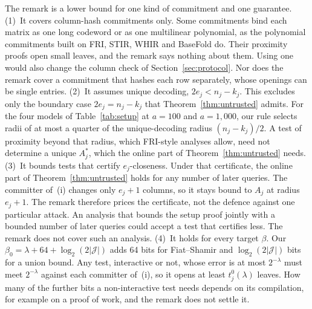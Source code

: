  The remark is a lower bound for one kind of commitment and one guarantee.
(1)~It covers column-hash commitments only. Some commitments bind each matrix as one long codeword
or as one multilinear polynomial, as the polynomial commitments built on FRI, STIR, WHIR and
BaseFold do. Their proximity proofs open small leaves, and the remark says nothing about them.
Using one would also change the column check of Section~\ref{sec:protocol}. Nor does the remark
cover a commitment that hashes each row separately, whose openings can be single entries.
(2)~It assumes unique decoding, $2e_j<n_j-k_j$. This excludes only the boundary case
$2e_j=n_j-k_j$ that Theorem~\ref{thm:untrusted} admits. For the four models of
Table~\ref{tab:setup} at $a=100$ and $a=1{,}000$, our rule selects radii of at most a quarter of the
unique-decoding radius $(n_j-k_j)/2$. A test of proximity beyond that radius, which FRI-style
analyses allow, need not determine a unique $A^*_j$, which the online part of
Theorem~\ref{thm:untrusted} needs.
(3)~It bounds tests that certify $e_j$-closeness. Under that certificate, the online part of
Theorem~\ref{thm:untrusted} holds for any number of later queries. The committer of~(i) changes only
$e_j+1$ columns, so it stays bound to $A_j$ at radius $e_j+1$. The remark therefore prices the
certificate, not the defence against one particular attack. An analysis that bounds the setup proof
jointly with a bounded number of later queries could accept a test that certifies less. The remark
does not cover such an analysis.
(4)~It holds for every target $\beta$. Our $\beta_0=\lambda+64+\log_2(2|\mathcal J|)$ adds 64 bits
for Fiat--Shamir and $\log_2(2|\mathcal J|)$ bits for a union bound. Any test, interactive or not,
whose error is at most $2^{-\lambda}$ must meet $2^{-\lambda}$ against each committer of~(i), so it
opens at least $t^0_j(\lambda)$ leaves. How many of the further bits a non-interactive test needs
depends on its compilation, for example on a proof of work, and the remark does not settle it.


